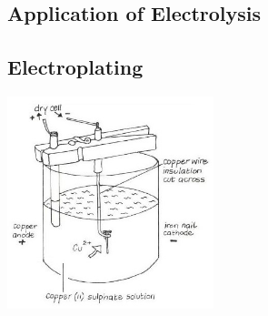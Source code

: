 \begin{multicols}{2}


\section*{Application of Electrolysis}


\subsection{Electroplating}

\begin{center}
\includegraphics[width=0.45\textwidth]{./img/vso/electroplating.jpg}
\end{center}


\end{multicols}
